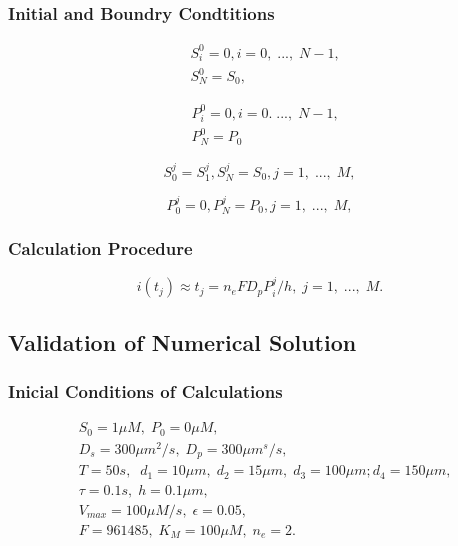 \documentclass[12pt, a4paper, lithuanian]{article}
\begin{document}
\subsubsection{Initial and Boundry Condtitions}
\begin{equation}
\begin{aligned}
    &S_i^0 = 0, i = 0,\;...,\;N-1,\\
    &S_N^0 = S_0,
\end{aligned}
\end{equation}

\begin{equation}
\begin{aligned}
    &P_i^0 = 0, i = 0.\;...,\;N-1,\\
    &P_N^0 = P_0
\end{aligned}
\end{equation}

\begin{equation} 
    S_0^j = S_1^j, S_N^j = S_0, j=1,\; ...,\;M, 
\end{equation}

\begin{equation} 
    P_0^j = 0, P_N^j = P_0, j=1,\; ...,\;M, 
\end{equation}

\subsubsection{Calculation Procedure}

\begin{equation} 
    i(t_j) \approx t_j = n_eFD_pP_i^j/h,\; j=1,\;...,\;M. 
\end{equation}

\subsection{Validation of Numerical Solution}
\subsubsection{Inicial Conditions of Calculations}

\begin{equation}
\begin{aligned}
    &S_0 = 1 \mu M,\; P_0 = 0 \mu M,\\
    &D_s = 300 \mu m^2/s,\; D_p = 300 \mu m^s/s,\\
    &T = 50s,\;\; d_1 = 10 \mu m,\; d_2 = 15\mu m,\; d_3 = 100\mu m; d_4 =
    150\mu m,\\
    &\tau = 0.1s,\; h=0.1 \mu m,\\
    &V_{max} = 100\mu M /s,\; \epsilon = 0.05,\\
    &F=961485,\; K_M= 100\mu M,\; n_e = 2.
\end{aligned}
\end{equation}
\end{document}

